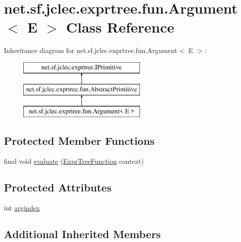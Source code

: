 \hypertarget{classnet_1_1sf_1_1jclec_1_1exprtree_1_1fun_1_1_argument_3_01_e_01_4}{\section{net.\-sf.\-jclec.\-exprtree.\-fun.\-Argument$<$ E $>$ Class Reference}
\label{classnet_1_1sf_1_1jclec_1_1exprtree_1_1fun_1_1_argument_3_01_e_01_4}
}
Inheritance diagram for net.\-sf.\-jclec.\-exprtree.\-fun.\-Argument$<$ E $>$\-:\begin{figure}[H]
\begin{center}
\leavevmode
\includegraphics[height=3.000000cm]{classnet_1_1sf_1_1jclec_1_1exprtree_1_1fun_1_1_argument_3_01_e_01_4}
\end{center}
\end{figure}
\subsection*{Protected Member Functions}
\begin{DoxyCompactItemize}
\item 
final void \hyperlink{classnet_1_1sf_1_1jclec_1_1exprtree_1_1fun_1_1_argument_3_01_e_01_4_a8961f8dae241232cc573ba53278f3b73}{evaluate} (\hyperlink{classnet_1_1sf_1_1jclec_1_1exprtree_1_1fun_1_1_expr_tree_function}{Expr\-Tree\-Function} context)
\end{DoxyCompactItemize}
\subsection*{Protected Attributes}
\begin{DoxyCompactItemize}
\item 
int \hyperlink{classnet_1_1sf_1_1jclec_1_1exprtree_1_1fun_1_1_argument_3_01_e_01_4_ab11c82b51e183d019a0d916c2841e5cc}{argindex}
\end{DoxyCompactItemize}
\subsection*{Additional Inherited Members}


